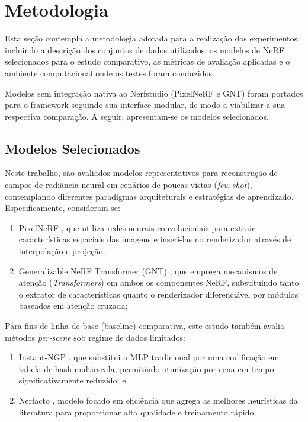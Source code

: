 \documentclass[12pt]{article}
\begin{document}
\section{Metodologia} 
\label{sec:metodology}

Esta seção contempla a metodologia adotada para a realização dos experimentos, incluindo a descrição dos conjuntos de dados utilizados, os modelos de NeRF selecionados para o estudo comparativo, as métricas de avaliação aplicadas e o ambiente computacional onde os testes foram conduzidos.

  Modelos sem integração nativa ao Nerfstudio (PixelNeRF e GNT) foram portados para o framework seguindo sua interface modular, de modo a viabilizar a sua respectiva comparação. A seguir, apresentam-se os modelos selecionados.

\subsection{Modelos Selecionados}
Neste trabalho, são avaliados modelos representativos para reconstrução de campos de radiância neural em cenários de poucas vistas (\textit{few-shot}), contemplando diferentes paradigmas arquiteturais e estratégias de aprendizado. Especificamente, consideram-se: 

\begin{enumerate}
\item PixelNeRF \cite{yu2021pixelnerfneuralradiancefields}, que utiliza redes neurais convolucionais para extrair características espaciais das imagens e inseri-las no renderizador através de interpolação e projeção; 

\item Generalizable NeRF Transformer (GNT) \cite{t2023attentionnerfneeds}, que emprega mecanismos de atenção (\textit{Transformers}) em ambos os componentes NeRF, substituindo tanto o extrator de características quanto o renderizador diferenciável por módulos baseados em atenção cruzada; 
\end{enumerate}

Para fins de linha de base (baseline) comparativa, este estudo também avalia métodos \textit{per-scene} sob regime de dados limitados: 

\begin{enumerate}
\item Instant-NGP \cite{muller2022}, que substitui a MLP tradicional por uma codificação em tabela de hash multiescala, permitindo otimização por cena em tempo significativamente reduzido; e

\item Nerfacto \cite{Tancik2023}, modelo focado em eficiência que agrega as melhores heurísticas da literatura para proporcionar alta qualidade e treinamento rápido.
\end{enumerate}
\end{document}
